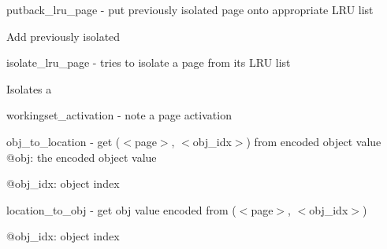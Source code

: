 putback\+\_\+lru\+\_\+page -\/ put previously isolated page onto appropriate L\+RU list

Add previously isolated

isolate\+\_\+lru\+\_\+page -\/ tries to isolate a page from its L\+RU list

Isolates a

workingset\+\_\+activation -\/ note a page activation

obj\+\_\+to\+\_\+location -\/ get ($<$page$>$, $<$obj\+\_\+idx$>$) from encoded object value @obj\+: the encoded object value

@obj\+\_\+idx\+: object index

location\+\_\+to\+\_\+obj -\/ get obj value encoded from ($<$page$>$, $<$obj\+\_\+idx$>$)

@obj\+\_\+idx\+: object index 